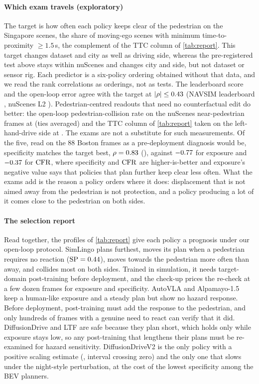 \paragraph{Which exam travels (exploratory)}
The target is how often each policy keeps clear of the pedestrian on the Singapore scenes, the share
of moving-ego scenes with minimum time-to-proximity $\ge1.5$\,s, the complement of the TTC column of
\cref{tab:report}. This target changes dataset and city as well as driving side, whereas the pre-registered test above stays within nuScenes and changes city and side, but not dataset or sensor rig. Each predictor is a six-policy ordering obtained
without that data, and we read the rank correlations as orderings, not as tests. The leaderboard score and the open-loop error agree with the target at $|\rho|\le0.43$ (NAVSIM leaderboard \NumRhoLbKeep, nuScenes L2 \NumRhoLtwoKeep). Pedestrian-centred readouts that need no counterfactual edit do better: the open-loop pedestrian-collision rate on the nuScenes near-pedestrian frames at \NumRhoPedcolKeep{} (ties averaged) and the TTC column of \cref{tab:report} taken on the left-hand-drive side at \NumOtherSideTTC. The exams are not a substitute for such measurements. Of the five, read on the 88 Boston frames as a pre-deployment diagnosis would be, specificity matches the target best, $\rho=0.83$ (\NumSpLhdList), against ${-}0.77$ for exposure and ${-}0.37$ for $\mathrm{CFR}$, where specificity and
$\mathrm{CFR}$ are higher-is-better and exposure's negative value says that policies that plan further keep
clear less often. What the exams add is the reason a policy orders where it does: displacement that
is not aimed away from the pedestrian is not protection, and a policy producing a lot of it comes
close to the pedestrian on both sides.

\paragraph{The selection report}
Read together, the profiles of \cref{tab:report} give each policy a prognosis under our open-loop
protocol. SimLingo plans furthest, moves its plan when a pedestrian requires no reaction
($\mathrm{SP}=0.44$), moves towards the pedestrian more often than away, and collides most on both sides.
Trained in simulation, it needs target-domain post-training before deployment, and the check-up prices
the re-check at a few dozen frames for exposure and specificity. AutoVLA and Alpamayo-1.5 keep a
human-like exposure and a steady plan but show no hazard response. Before deployment, post-training must add the response to the pedestrian, and only hundreds of frames with a genuine need to react can verify that it did. DiffusionDrive and LTF are safe because
they plan short, which holds only while exposure stays low, so any post-training that lengthens their
plans must be re-examined for hazard sensitivity. DiffusionDriveV2 is the only policy with a positive scaling estimate (\NumScalHi, interval crossing zero) and the only one that slows under the night-style perturbation, at the cost of the lowest specificity among the BEV planners.


